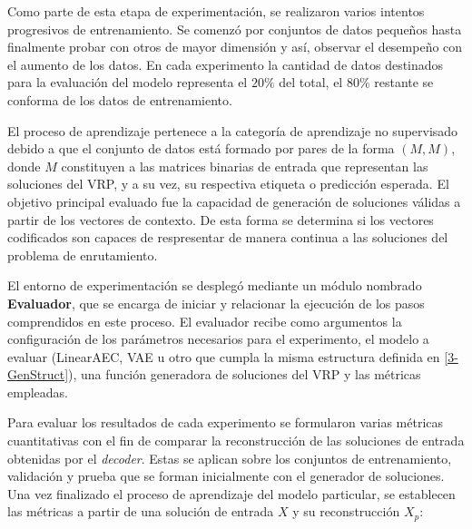 Como parte de esta etapa de experimentación, se realizaron varios intentos progresivos de entrenamiento. Se comenzó por conjuntos de datos pequeños hasta finalmente probar con otros de mayor dimensión y así, observar el desempeño con el aumento de los datos. En cada experimento la cantidad de datos destinados para la evaluación del modelo representa el $20\%$ del total, el 80\% restante se conforma de los datos de entrenamiento.

El proceso de aprendizaje pertenece a la categoría de aprendizaje no supervisado debido a que el conjunto de datos está formado por pares de la forma $(M, M)$, donde $M$ constituyen a las matrices binarias de entrada que representan las soluciones del VRP, y a su vez, su respectiva etiqueta o predicción esperada. El objetivo principal evaluado fue la capacidad de generación de soluciones válidas a partir de los vectores de contexto. De esta forma se determina si los vectores codificados son capaces de respresentar de manera continua a las soluciones del problema de enrutamiento.

El entorno de experimentación se desplegó mediante un módulo nombrado \textbf{Evaluador}, que se encarga de iniciar y relacionar la ejecución de los pasos comprendidos en este proceso. El evaluador recibe como argumentos la configuración de los parámetros necesarios para el experimento, el modelo a evaluar (LinearAEC, VAE u otro que cumpla la misma estructura definida en \ref{3-GenStruct}), una función generadora de soluciones del VRP y las métricas empleadas.

Para evaluar los resultados de cada experimento se formularon varias métricas cuantitativas con el fin de comparar la reconstrucción de las soluciones de entrada obtenidas por el \textit{decoder}. Estas se aplican sobre los conjuntos de entrenamiento, validación y prueba que se forman inicialmente con el generador de soluciones. Una vez finalizado el proceso de aprendizaje del modelo particular, se establecen las métricas a partir de una solución de entrada $X$ y su reconstrucción $X_p$:

